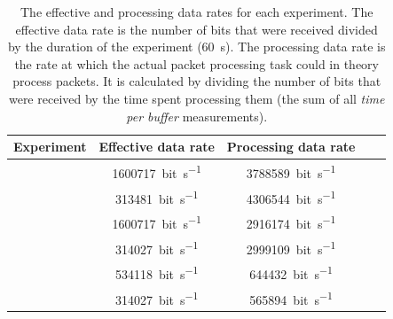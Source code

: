 \clearpage
\begin{table}[ht]
    \centering
    \renewcommand{\arraystretch}{1.1}
    \begin{tabularx}{\textwidth}{|>{\raggedleft\arraybackslash}X||c|c|c|c|}
        \hline
        \textbf{Experiment} & \textbf{Effective data rate} & \textbf{Processing data rate} \\
        \hline

        \nameref{evaluation/results/trace-no-delay} &
        \SI{1600717}{bit\per\second} &
        \SI{3788589}{bit\per\second}
        \\
        \hline

        \nameref{evaluation/results/trace-100us-delay} &
        \SI{313481}{bit\per\second} &
        \SI{4306544}{bit\per\second}
        \\
        \hline

        \nameref{evaluation/results/synthetic-read-write-instructions-no-delay} &
        \SI{1600717}{bit\per\second} &
        \SI{2916174}{bit\per\second}
        \\
        \hline

        \nameref{evaluation/results/synthetic-read-write-instructions-100us-delay} &
        \SI{314027}{bit\per\second} &
        \SI{2999109}{bit\per\second}
        \\
        \hline

        \nameref{evaluation/results/synthetic-ping-instructions-no-delay} &
        \SI{534118}{bit\per\second} &
        \SI{644432}{bit\per\second}
        \\
        \hline

        \nameref{evaluation/results/synthetic-ping-instructions-100us-delay} &
        \SI{314027}{bit\per\second} &
        \SI{565894}{bit\per\second}
        \\
        \hline
    \end{tabularx}
    \caption{
        The effective and processing data rates for each experiment. The effective data rate is the
        number of bits that were received divided by the duration of the experiment (\SI{60}{\second}).
        The processing data rate is the rate at which the actual packet processing task could in
        theory process packets. It is calculated by dividing the number of bits that were received
        by the time spent processing them (the sum of all \textit{time per buffer} measurements).
    }
    \label{evaluation/results/results-by-experiment/data-rates}
\end{table}
